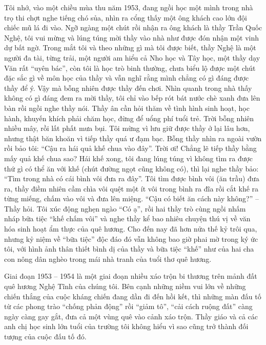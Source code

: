 Tôi nhớ, vào một chiều mùa thu năm 1953, đang ngồi học một mình trong nhà trọ thi chợt nghe tiếng chó sủa, nhìn ra cổng thấy một ông khách cao lớn đội chiếc mũ lá đi vào. Ngỡ ngàng một chút rồi nhận ra ông khách là thầy Trần Quốc Nghệ, tôi vui mừng và lúng túng mời thầy vào nhà như được đón nhận một vinh dự bất ngờ. Trong mắt tôi và theo những gì mà tôi được biết, thầy Nghệ là một người đa tài, từng trải, một người am hiểu cả Nho học và Tây học, một thầy dạy Văn rất “uyên bác”, còn tôi là học trò binh thường, chưa biểu lộ được một chút đặc sắc gì về môn học của thầy và vẫn nghĩ rằng mình chẳng có gì đáng được thầy để ý. Vậy mà bỗng nhiên được thầy đến chơi. Nhìn quanh trong nhà thấy không có gì đáng đem ra mời thầy, tôi chỉ vào bếp rót bát nước chè xanh đưa lên bàn rồi ngồi nghe thầy nói. Thầy ân cần hỏi thăm về tình hình sinh hoạt, học hành, khuyến khích phải chăm học, đừng để uổng phí tuổi trẻ. Trời bỗng nhiên nhiều mây, rồi lất phất mưa bụi. Tôi mừng vì lưu giữ được thầy ở lại lâu hơn, nhưng thật băn khoăn vì tiếp thầy quá ư đạm bạc. Bỗng thầy nhìn ra ngoài vườn rồi bảo tôi: “Cậu ra hái quả khế chua vào đây”. Trời ơi! Chẳng lẽ tiếp thầy bằng mấy quả khế chua sao? Hái khế xong, tôi đang lúng túng vì không tìm ra được thứ gì có thể ăn với khế (chút đường ngọt cũng không có), thì lại nghe thầy bảo: “Tìm trong nhà có cái bình vôi đưa ra đây”. Tôi tìm được bình vôi (ăn trầu) đưa ra, thầy điềm nhiên cầm chìa vôi quệt một ít vôi trong bình ra đĩa rồi cắt khế ra từng miếng, chấm vào vôi và đưa lên miệng. “Cậu có biết ăn cách này không?” – Thầy hỏi. Tôi xúc động nghẹn ngào “Có ạ”, rồi hai thầy trò cùng ngồi nhấm nháp bữa tiệc “khế chấm vôi” và nghe thầy kể bao nhiêu chuyện thú vị về văn hóa sinh hoạt ẩm thực của quê hương. Cho đến nay đã hơn nửa thế kỷ trôi qua, nhưng kỷ niệm về “bữa tiệc” độc đáo đó vẫn không bao giờ phai mờ trong ký ức tôi, với hình ảnh thân thiết bình dị của thầy và bữa tiệc “khế” như của hai cha con nông dân nghèo trong mái nhà tranh của tuổi thơ quê hương.

Giai đoạn 1953 – 1954 là một giai đoạn nhiều xáo trộn bi thương trên mảnh đất quê hương Nghệ Tĩnh của chúng tôi. Bên cạnh những niềm vui lớn về những chiến thắng của cuộc kháng chiến đang dần đi đến hồi kết, thì những màn đấu tố từ các phong trào “chống phản động” rồi “giảm tô”, “cải cách ruộng đất” càng ngày càng gay gắt, đưa cả một vùng quê vào cảnh xáo trộn. Thầy giáo và cả các anh chị học sinh lớn tuổi của trường tôi không hiểu vì sao cũng trở thành đối tượng của cuộc đấu tố đó.

